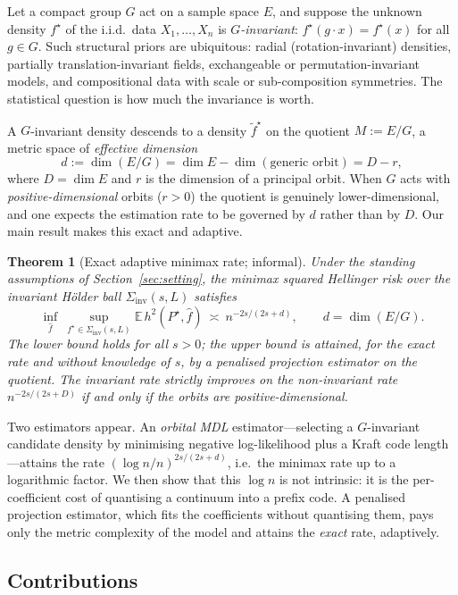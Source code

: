 \documentclass[11pt]{article}
\theoremstyle{plain}
\newtheorem{theorem}{Theorem}[section]
\theoremstyle{definition}
\theoremstyle{remark}
\newcommand{\E}{\mathbb{E}}
\newcommand{\Siv}{\Sigma_{\mathrm{inv}}}
\DeclareMathOperator{\dimm}{dim}
\begin{document}
Let a compact group $G$ act on a sample space $E$, and suppose the unknown density
$f^\star$ of the i.i.d.\ data $X_1,\dots,X_n$ is \emph{$G$-invariant}:
$f^\star(g\cdot x)=f^\star(x)$ for all $g\in G$. Such structural priors are
ubiquitous: radial (rotation-invariant) densities, partially translation-invariant
fields, exchangeable or permutation-invariant models, and compositional data with
scale or sub-composition symmetries. The statistical question is how much the
invariance is worth.

A $G$-invariant density descends to a density $\tilde f^\star$ on the quotient
$M:=E/G$, a metric space of \emph{effective dimension}
\begin{equation}\label{eq:deff}
d:=\dimm(E/G)=\dimm E-\dimm(\text{generic orbit})=D-r ,
\end{equation}
where $D=\dimm E$ and $r$ is the dimension of a principal orbit. When $G$ acts
with \emph{positive-dimensional} orbits ($r>0$) the quotient is genuinely
lower-dimensional, and one expects the estimation rate to be governed by $d$ rather
than by $D$. Our main result makes this exact and adaptive.

\begin{theorem}[Exact adaptive minimax rate; informal]\label{thm:informal}
Under the standing assumptions of Section~\ref{sec:setting}, the minimax squared
Hellinger risk over the invariant H\"older ball $\Siv(s,L)$ satisfies
\[
\inf_{\widehat f}\ \sup_{f^\star\in\Siv(s,L)}\E\,h^2(P^\star,\widehat f)
\ \asymp\ n^{-2s/(2s+d)},\qquad d=\dimm(E/G).
\]
The lower bound holds for all $s>0$; the upper bound is attained, \emph{for the
exact rate and without knowledge of $s$}, by a penalised projection estimator on
the quotient. The invariant rate strictly improves on the non-invariant rate
$n^{-2s/(2s+D)}$ if and only if the orbits are positive-dimensional.
\end{theorem}

Two estimators appear. An \emph{orbital MDL} estimator---selecting a $G$-invariant
candidate density by minimising negative log-likelihood plus a Kraft code
length---attains the rate $(\log n/n)^{2s/(2s+d)}$, i.e.\ the minimax rate up to a
logarithmic factor. We then show that this $\log n$ is not intrinsic: it is the
per-coefficient cost of quantising a continuum into a prefix code. A penalised
projection estimator, which fits the coefficients without quantising them, pays
only the metric complexity of the model and attains the \emph{exact} rate,
adaptively.

\subsection{Contributions}
\end{document}
